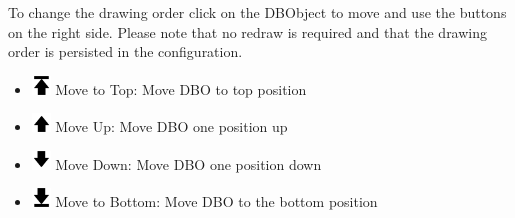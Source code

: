 To change the drawing order click on the DBObject to move and use the buttons on the right side. Please note that no redraw is required and that the drawing order is persisted in the configuration.
% 
 \begin{itemize}
 \item \includegraphics[width=0.5cm]{../../data/icons/top.png} Move to Top: Move DBO to top position
 \item \includegraphics[width=0.5cm]{../../data/icons/up.png} Move Up: Move DBO one position up
 \item \includegraphics[width=0.5cm]{../../data/icons/down.png} Move Down: Move DBO one position down
 \item \includegraphics[width=0.5cm]{../../data/icons/bottom.png} Move to Bottom: Move DBO to the bottom position
\end{itemize}
